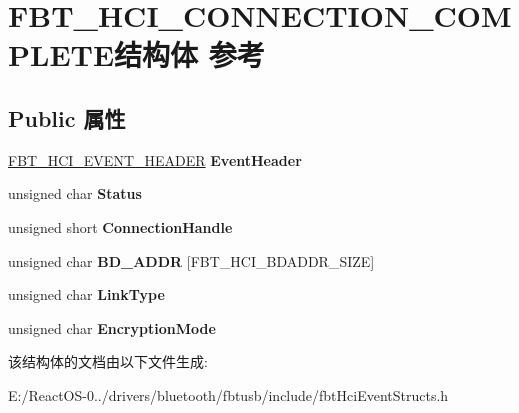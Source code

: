 \hypertarget{struct_f_b_t___h_c_i___c_o_n_n_e_c_t_i_o_n___c_o_m_p_l_e_t_e}{}\section{F\+B\+T\+\_\+\+H\+C\+I\+\_\+\+C\+O\+N\+N\+E\+C\+T\+I\+O\+N\+\_\+\+C\+O\+M\+P\+L\+E\+T\+E结构体 参考}
\label{struct_f_b_t___h_c_i___c_o_n_n_e_c_t_i_o_n___c_o_m_p_l_e_t_e}
\subsection*{Public 属性}
\begin{DoxyCompactItemize}
\item 
\mbox{\label{struct_f_b_t___h_c_i___c_o_n_n_e_c_t_i_o_n___c_o_m_p_l_e_t_e_a6908fb8342dec3083527aad050cebdff}} 
\hyperlink{struct_f_b_t___h_c_i___e_v_e_n_t___h_e_a_d_e_r}{F\+B\+T\+\_\+\+H\+C\+I\+\_\+\+E\+V\+E\+N\+T\+\_\+\+H\+E\+A\+D\+ER} {\bfseries Event\+Header}
\item 
\mbox{\label{struct_f_b_t___h_c_i___c_o_n_n_e_c_t_i_o_n___c_o_m_p_l_e_t_e_a57715c5abcc07feafc397d3ac452733d}} 
unsigned char {\bfseries Status}
\item 
\mbox{\label{struct_f_b_t___h_c_i___c_o_n_n_e_c_t_i_o_n___c_o_m_p_l_e_t_e_ab140eb757e3f8e2f1c58ca70504f0c35}} 
unsigned short {\bfseries Connection\+Handle}
\item 
\mbox{\label{struct_f_b_t___h_c_i___c_o_n_n_e_c_t_i_o_n___c_o_m_p_l_e_t_e_a6d30cc93e47b357ef72394e9db08ac89}} 
unsigned char {\bfseries B\+D\+\_\+\+A\+D\+DR} \mbox{[}F\+B\+T\+\_\+\+H\+C\+I\+\_\+\+B\+D\+A\+D\+D\+R\+\_\+\+S\+I\+ZE\mbox{]}
\item 
\mbox{\label{struct_f_b_t___h_c_i___c_o_n_n_e_c_t_i_o_n___c_o_m_p_l_e_t_e_a7ed6abb66f7cff8d13ca2a269a59439f}} 
unsigned char {\bfseries Link\+Type}
\item 
\mbox{\label{struct_f_b_t___h_c_i___c_o_n_n_e_c_t_i_o_n___c_o_m_p_l_e_t_e_ad16afa0cfdbd7bd66b7b9e44954af82a}} 
unsigned char {\bfseries Encryption\+Mode}
\end{DoxyCompactItemize}


该结构体的文档由以下文件生成\+:\begin{DoxyCompactItemize}
\item 
E\+:/\+React\+O\+S-\/0../drivers/bluetooth/fbtusb/include/fbt\+Hci\+Event\+Structs.\+h\end{DoxyCompactItemize}
